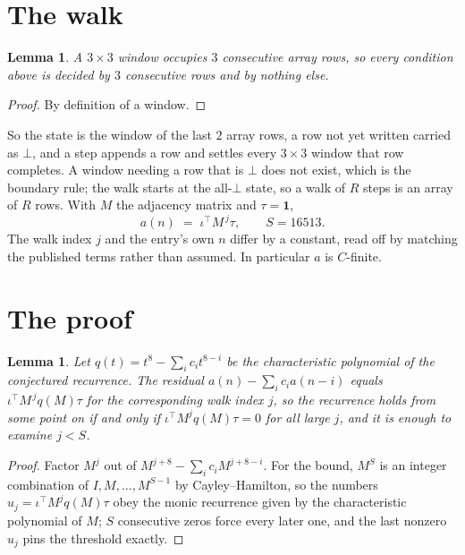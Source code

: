 \documentclass[11pt,a4paper]{article}
\theoremstyle{plain}
\newtheorem{lemma}[theorem]{Lemma}
\theoremstyle{definition}
\begin{document}
\section{The walk}

\begin{lemma}\label{lem:win}
A $3\times3$ window occupies $3$ consecutive array rows, so every condition above is
decided by $3$ consecutive rows and by nothing else.
\end{lemma}

\begin{proof}
By definition of a window.
\end{proof}

So the state is the window of the last $2$ array rows, a row not yet written carried as
$\bot$, and a step appends a row and settles every $3\times3$ window that row completes. A
window needing a row that is $\bot$ does not exist, which is the boundary rule; the walk starts
at the all-$\bot$ state, so a walk of $R$ steps is an array of $R$ rows. With $M$ the adjacency
matrix and $\tau=\mathbf{1}$,
\[
a(n)\;=\;\iota^{\!\top}M^{\,j}\tau ,\qquad S=16513.
\]
The walk index $j$ and the entry's own $n$ differ by a constant, read off by matching the
published terms rather than assumed. In particular $a$ is $C$-finite.

\section{The proof}

\begin{lemma}\label{lem:crit}
Let $q(t)=t^{8}-\sum_i c_it^{8-i}$ be the characteristic polynomial of the
conjectured recurrence. The residual $a(n)-\sum_ic_ia(n-i)$ equals
$\iota^{\!\top}M^{\,j}q(M)\tau$ for the corresponding walk index $j$, so the recurrence
holds from some point on if and only if $\iota^{\!\top}M^{j}q(M)\tau=0$ for all large $j$,
and it is enough to examine $j<S$.
\end{lemma}

\begin{proof}
Factor $M^{j}$ out of $M^{j+8}-\sum_ic_iM^{j+8-i}$. For the bound, $M^{S}$
is an integer combination of $I,M,\dots,M^{S-1}$ by Cayley--Hamilton, so the numbers
$u_j=\iota^{\!\top}M^{j}q(M)\tau$ obey the monic recurrence given by the characteristic
polynomial of $M$; $S$ consecutive zeros force every later one, and the last nonzero $u_j$
pins the threshold exactly.
\end{proof}
\end{document}

